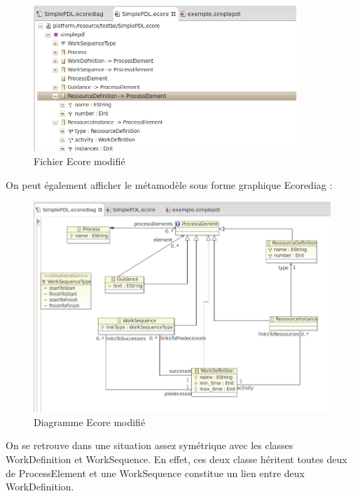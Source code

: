 \documentclass{report}
\begin{document}
\begin{figure}[!h] 
\begin{center}
\includegraphics[width=10cm]{Capture-2.png}
\caption{Fichier Ecore modifié} 
\label{img1} 
\end{center}
\end{figure} 

On peut également afficher le métamodèle sous forme graphique Ecorediag :\\

\begin{figure}[!h] 
\begin{center}
\includegraphics[width=15cm]{Capture-4.png}
\caption{Diagramme Ecore modifié} 
\label{img1} 
\end{center}
\end{figure} 

On se retrouve dans une situation assez symétrique avec les classes WorkDefinition et WorkSequence. En effet, ces deux classe héritent toutes deux de ProcessElement et une WorkSequence constitue un lien entre deux WorkDefinition.\\
\end{document}
